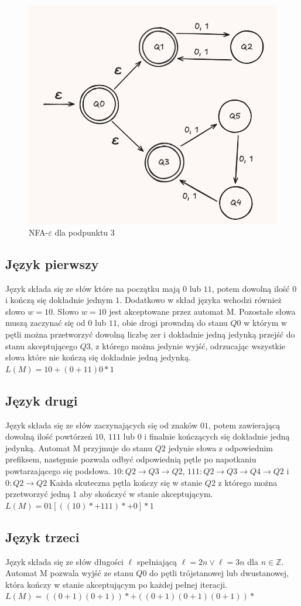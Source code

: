 \documentclass{article}
\begin{document}
\begin{figure}[h]
  \includegraphics[width=1\textwidth]{13.png}
  \caption{NFA-$\varepsilon$ dla podpunktu 3}
\end{figure}
\subsection{Język pierwszy}
Język składa się ze słów które na początku mają $0$ lub $11$, potem dowolną ilość $0$ i kończą się dokładnie jednym $1$. Dodatkowo w skład języka wchodzi również słowo $w = 10$.
Słowo $w = 10$ jest akceptowane przez automat M. Pozostałe słowa muszą zaczynać się od $0$ lub $11$, obie drogi prowadzą do stanu $Q0$ w którym w pętli można przetworzyć dowolną liczbę zer i dokładnie jedną jedynką przejść do stanu akceptującego $Q3$, z którego można
jedynie wyjść, odrzucając wszystkie słowa które nie kończą się dokładnie jedną jedynką. $L(M) = 10+(0+11)0*1$
\subsection{Język drugi}
Język składa się ze słów zaczynających się od znaków $01$, potem zawierającą dowolną ilość powtórzeń $10$, $111$ lub $0$ i finalnie kończących się dokładnie jedną jedynką.
Automat M przyjmuje do stanu $Q2$ jedynie słowa z odpowiednim prefiksem, następnie pozwala odbyć odpowiednią pętle po napotkaniu powtarzającego się podsłowa. $10: Q2 \rightarrow Q3\rightarrow Q2$, $111: Q2 \rightarrow Q3 \rightarrow Q4 \rightarrow Q2$ i $0: Q2 \rightarrow Q2$
Każda skuteczna pętla kończy się w stanie $Q2$ z którego można przetworzyć jedną $1$ aby skończyć w stanie akceptującym.  $L(M) = 01[((10)*+111)*+0]*1$
\subsection{Język trzeci}
Język składa się ze słów długości $\ell$ spełniającą $\ell = 2n \lor \ell = 3n$ dla $n \in \mathbb{Z}$. Automat M pozwala wyjść ze stanu $Q0$ do pętli trójstanowej lub dwustanowej, która kończy w stanie akceptującym po każdej pełnej iteracji. $L(M) = ((0+1)(0+1))*+((0+1)(0+1)(0+1))*$
\end{document}
